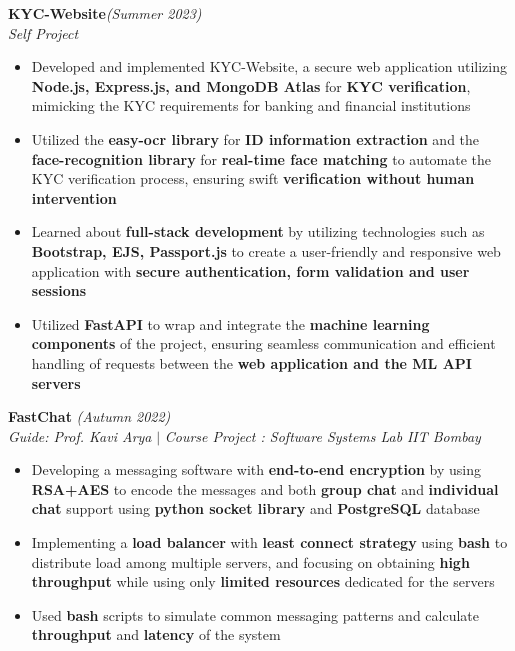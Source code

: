 \documentclass[a4paper,10pt]{article}
\begin{document}
\pagebreak
{}
\vspace{\baselineskip}
\vspace{-15pt}
\noindent\textbf{\large KYC-Website}\hfill{\sl \small (Summer 2023)}\\
{\it Self Project}
\\\vspace{-15pt}
\begin{itemize}[itemsep = -0.65 mm, leftmargin=*]
    \item Developed and implemented KYC-Website, a secure web application utilizing \textbf{Node.js, Express.js, and MongoDB Atlas} for \textbf{KYC verification}, mimicking the KYC requirements for banking and financial institutions
    \item Utilized the \textbf{easy-ocr library} for \textbf{ID information extraction} and the \textbf{face-recognition library} for \textbf{real-time face matching} to automate the KYC verification process, ensuring swift \textbf{verification without human intervention}
    \item Learned about \textbf{full-stack development} by utilizing technologies such as \textbf{Bootstrap, EJS, Passport.js} to create a user-friendly and responsive web application with \textbf{secure authentication, form validation and user sessions}
    \item Utilized \textbf{FastAPI} to wrap and integrate the \textbf{machine learning components} of the project, ensuring seamless communication and efficient handling of requests between the \textbf{web application and the ML API servers}
\end{itemize}
\vspace{\baselineskip}
\vspace{-15pt}
\noindent\textbf{\large FastChat} \hfill{\sl \small (Autumn 2022)}\\
{\it Guide: Prof. Kavi Arya} $|$ {\it Course Project : Software Systems Lab } \hfill{\it IIT Bombay}\\
\vspace{-15pt}
\begin{itemize}[itemsep = -0.65 mm, leftmargin=*]
    \item Developing a messaging software with \textbf{end-to-end encryption} by using \textbf{RSA+AES} to encode the messages and both \textbf{group chat} and \textbf{individual chat} support using \textbf{python socket library} and \textbf{PostgreSQL} database
    \item Implementing a \textbf{load balancer} with \textbf{least connect strategy} using \textbf{bash} to distribute load among multiple servers, and focusing on obtaining \textbf{high throughput} while using only \textbf{limited resources} dedicated for the servers
    \item Used \textbf{bash} scripts to simulate common messaging patterns and calculate \textbf{throughput} and \textbf{latency} of the system
\end{itemize}
\end{document}
